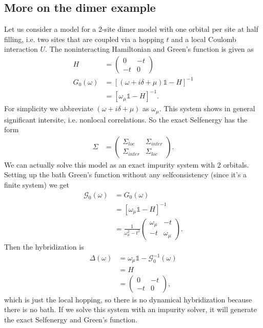 \documentclass[12pt,a4paper]{scrartcl}
\numberwithin{equation}{section}
\newcommand{\unity}{\mathds{1}}
\begin{document}
\subsection{More on the dimer example}
Let us consider a model for a 2-site dimer model with one orbital per site
at half filling, i.e. two sites that are coupled via a hopping $t$
and a local Coulomb interaction $U$. 
The noninteracting Hamiltonian and Green's function is given as
\begin{align}
 H &= 
 \begin{pmatrix}
  0 & -t \\ -t & 0
 \end{pmatrix} \\
 G_0(\omega) &= \left[(\omega +i\delta + \mu ) \unity -H  \right]^{-1} \\
 &= \left[\omega_{\mu} \unity -H  \right]^{-1} .
\end{align}
For simplicity we abbreviate $(\omega +i\delta + \mu)$ as $\omega_{\mu}$.
This system shows in general significant intersite, i.e.
nonlocal correlations. So the exact Selfenergy has the form
\begin{align}
 \Sigma &= 
 \begin{pmatrix}
  \Sigma_{loc} & \Sigma_{inter} \\ \Sigma_{inter} & \Sigma_{loc}
 \end{pmatrix} .
\end{align}
We can actually solve this model as an exact impurity system with 2 orbitals. Setting up
the bath Green's function without any selfconsistency (since it's a finite system) we get
\begin{align}
 \mathcal{G}_0(\omega) &= G_0(\omega) \nonumber \\
 &= \left[\omega_{\mu} \unity -H  \right]^{-1} \nonumber \\ 
 &=\frac{1}{\omega_{\mu}^2-t^2} 
   \begin{pmatrix}
     \omega_{\mu} & -t \\ -t  & \omega_{\mu}
    \end{pmatrix}. 
\end{align}
Then the hybridization is
\begin{align}
 \Delta(\omega) &=\omega_{\mu} \unity - \mathcal{G}^{-1}_0(\omega) \nonumber \\
 &= H \nonumber \\ 
 &=\begin{pmatrix}
  0 & -t \\ -t & 0
 \end{pmatrix},
\end{align}
which is just the local hopping, so there is no dynamical hybridization because there is no bath.
If we solve this system with an impurity solver, it will generate the exact
Selfenergy and Green's function.
\end{document}
